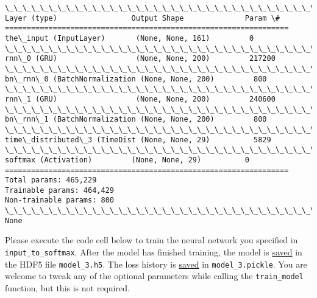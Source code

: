 \documentclass[11pt]{article}
\begin{document}
    \begin{Verbatim}[commandchars=\\\{\}]
\_\_\_\_\_\_\_\_\_\_\_\_\_\_\_\_\_\_\_\_\_\_\_\_\_\_\_\_\_\_\_\_\_\_\_\_\_\_\_\_\_\_\_\_\_\_\_\_\_\_\_\_\_\_\_\_\_\_\_\_\_\_\_\_\_
Layer (type)                 Output Shape              Param \#   
=================================================================
the\_input (InputLayer)       (None, None, 161)         0         
\_\_\_\_\_\_\_\_\_\_\_\_\_\_\_\_\_\_\_\_\_\_\_\_\_\_\_\_\_\_\_\_\_\_\_\_\_\_\_\_\_\_\_\_\_\_\_\_\_\_\_\_\_\_\_\_\_\_\_\_\_\_\_\_\_
rnn\_0 (GRU)                  (None, None, 200)         217200    
\_\_\_\_\_\_\_\_\_\_\_\_\_\_\_\_\_\_\_\_\_\_\_\_\_\_\_\_\_\_\_\_\_\_\_\_\_\_\_\_\_\_\_\_\_\_\_\_\_\_\_\_\_\_\_\_\_\_\_\_\_\_\_\_\_
bn\_rnn\_0 (BatchNormalization (None, None, 200)         800       
\_\_\_\_\_\_\_\_\_\_\_\_\_\_\_\_\_\_\_\_\_\_\_\_\_\_\_\_\_\_\_\_\_\_\_\_\_\_\_\_\_\_\_\_\_\_\_\_\_\_\_\_\_\_\_\_\_\_\_\_\_\_\_\_\_
rnn\_1 (GRU)                  (None, None, 200)         240600    
\_\_\_\_\_\_\_\_\_\_\_\_\_\_\_\_\_\_\_\_\_\_\_\_\_\_\_\_\_\_\_\_\_\_\_\_\_\_\_\_\_\_\_\_\_\_\_\_\_\_\_\_\_\_\_\_\_\_\_\_\_\_\_\_\_
bn\_rnn\_1 (BatchNormalization (None, None, 200)         800       
\_\_\_\_\_\_\_\_\_\_\_\_\_\_\_\_\_\_\_\_\_\_\_\_\_\_\_\_\_\_\_\_\_\_\_\_\_\_\_\_\_\_\_\_\_\_\_\_\_\_\_\_\_\_\_\_\_\_\_\_\_\_\_\_\_
time\_distributed\_3 (TimeDist (None, None, 29)          5829      
\_\_\_\_\_\_\_\_\_\_\_\_\_\_\_\_\_\_\_\_\_\_\_\_\_\_\_\_\_\_\_\_\_\_\_\_\_\_\_\_\_\_\_\_\_\_\_\_\_\_\_\_\_\_\_\_\_\_\_\_\_\_\_\_\_
softmax (Activation)         (None, None, 29)          0         
=================================================================
Total params: 465,229
Trainable params: 464,429
Non-trainable params: 800
\_\_\_\_\_\_\_\_\_\_\_\_\_\_\_\_\_\_\_\_\_\_\_\_\_\_\_\_\_\_\_\_\_\_\_\_\_\_\_\_\_\_\_\_\_\_\_\_\_\_\_\_\_\_\_\_\_\_\_\_\_\_\_\_\_
None

    \end{Verbatim}

    Please execute the code cell below to train the neural network you
specified in \texttt{input\_to\_softmax}. After the model has finished
training, the model is
\href{https://keras.io/getting-started/faq/\#how-can-i-save-a-keras-model}{saved}
in the HDF5 file \texttt{model\_3.h5}. The loss history is
\href{https://wiki.python.org/moin/UsingPickle}{saved} in
\texttt{model\_3.pickle}. You are welcome to tweak any of the optional
parameters while calling the \texttt{train\_model} function, but this is
not required.
\end{document}
